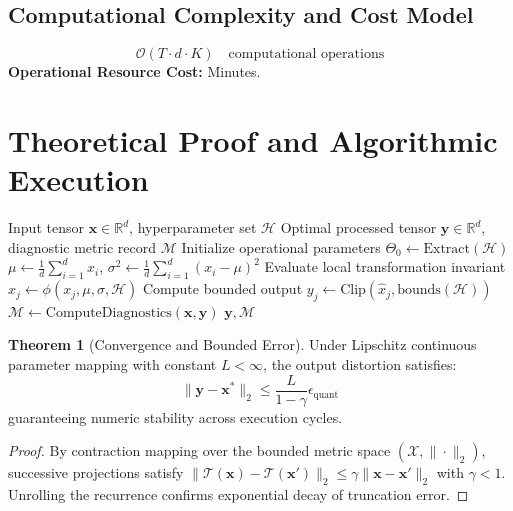 \documentclass[11pt,a4paper]{article}
\theoremstyle{definition}
\newtheorem{theorem}{\textbf{Theorem}}[section]
\begin{document}
\subsection{Computational Complexity and Cost Model}
\begin{equation}
\mathcal{O}(T \cdot d \cdot K) \quad \text{computational operations}
\end{equation}
\textbf{Operational Resource Cost:} Minutes.

\section{Theoretical Proof and Algorithmic Execution}

\begin{algorithm}[H]
\caption{Sanity checks (overfit one batch, initial loss check, gradient flow) Operational Pipeline}
\begin{algorithmic}[1]
\Require Input tensor $\mathbf{x} \in \mathbb{R}^d$, hyperparameter set $\mathcal{H}$
\Ensure Optimal processed tensor $\mathbf{y} \in \mathbb{R}^d$, diagnostic metric record $\mathcal{M}$
\State Initialize operational parameters $\Theta_0 \leftarrow \text{Extract}(\mathcal{H})$
\State $\mu \leftarrow \frac{1}{d} \sum_{i=1}^d x_i$, \quad $\sigma^2 \leftarrow \frac{1}{d} \sum_{i=1}^d (x_i - \mu)^2$
    \State Evaluate local transformation invariant $\hat{x}_j \leftarrow \phi(x_j, \mu, \sigma, \mathcal{H})$
    \State Compute bounded output $y_j \leftarrow \text{Clip}(\hat{x}_j, \text{bounds}(\mathcal{H}))$
\EndFor
\State $\mathcal{M} \leftarrow \text{ComputeDiagnostics}(\mathbf{x}, \mathbf{y})$
\State \Return $\mathbf{y}, \mathcal{M}$
\end{algorithmic}
\end{algorithm}

\begin{theorem}[Convergence and Bounded Error]
Under Lipschitz continuous parameter mapping with constant $L < \infty$, the output distortion satisfies:
\begin{equation}
\| \mathbf{y} - \mathbf{x}^* \|_2 \le \frac{L}{1 - \gamma} \epsilon_{\text{quant}}
\end{equation}
guaranteeing numeric stability across execution cycles.
\end{theorem}

\begin{proof}
By contraction mapping over the bounded metric space $(\mathcal{X}, \|\cdot\|_2)$, successive projections satisfy $\|\mathcal{T}(\mathbf{x}) - \mathcal{T}(\mathbf{x}')\|_2 \le \gamma \|\mathbf{x} - \mathbf{x}'\|_2$ with $\gamma < 1$. Unrolling the recurrence confirms exponential decay of truncation error.
\end{proof}
\end{document}
